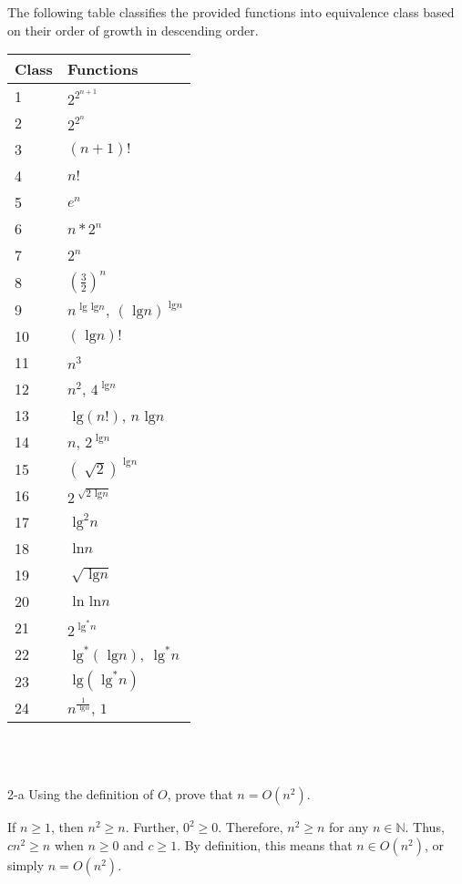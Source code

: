 \documentclass[11pt]{article}
\newcommand{\tlg}{\text{ lg}}
\newcommand{\tln}{\text{ ln}}
\begin{document}
\begin{prob}{1}
\end{prob}
\begin{sol} 

The following table classifies the provided functions into equivalence class based on their order of growth in descending order.  \\

\begin{tabular}{|l|l|}
	\hline
	\textbf{Class} & \textbf{Functions} \\
	\hline 
	1 & $2^{2^{n+1}}$ \\
	2 & $2^{2^{n}}$ \\
	3 & $(n+1)!$ \\
	4 & $n!$ \\
	5 & $e^{n}$ \\
	6 & $n * 2^{n}$ \\
	7 & $2^{n} $ \\
	8 & $(\frac{3}{2})^{n}$ \\ 
	9 & $n^{\tlg \tlg n}$, $(\tlg n)^{\tlg n}$ \\
	10 & $(\tlg n)!$ \\
	11 & $n^{3}$ \\
	12 & $n^{2}$, $4^{\tlg n}$ \\
	13 & $\tlg(n!)$, $n \tlg n$ \\
	14 & $n$, $2^{\tlg n}$ \\
	15 & $(\sqrt[]{2})^{\tlg n}$ \\
	16 & $2^{\sqrt[]{2\tlg n}}$ \\
	17 & $\tlg^{2}n$ \\
	18 & $\tln n$ \\
	19 & $\sqrt[]{\tlg n}$ \\
	20 & $\tln \tln n$ \\
	21 & $2^{\tlg^{*}n}$ \\
	22 & $\tlg^{*}(\tlg n)$, $\tlg^{*}n$ \\
	23 & $\tlg(\tlg^{*}n)$ \\
	24 & $n^{\frac{1}{\tlg n}}$, $1$ \\
	\hline
\end{tabular} \\ \\
\end{sol}

\begin{prob}{2-a}
Using the definition of $O$, prove that $n = O(n^{2})$.
\end{prob}
\begin{sol} 
If $n \geq 1$, then $n^{2} \geq n$. Further, $0^{2} \geq 0$. Therefore, $n^{2} \geq n$ for any $n \in \mathbb{N}$. Thus, $cn^{2} \geq n$ when $n \geq 0$ and $c \geq 1$. By definition, this means that $n \in O(n^{2})$, or simply $n = O(n^{2})$.
\end{sol}
\end{document}
